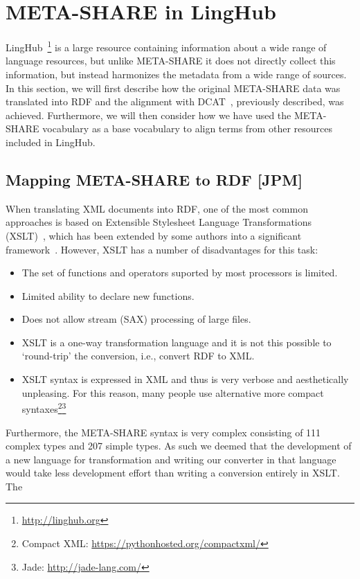\documentclass{llncs}
\begin{document}
{\section{META-SHARE in LingHub}
\label{sec:linghub}
LingHub~\footnote{\url{http://linghub.org}} is a large resource containing information about a wide range of
language resources, but unlike META-SHARE it does not directly collect this
information, but instead harmonizes the metadata from a wide range of sources.
In this section, we will first describe how the original META-SHARE data was
translated into RDF and the alignment with DCAT~\cite{maali2014data}, previously
described, was achieved. Furthermore, we will then consider how we have used the
META-SHARE vocabulary as a base vocabulary to align terms from other resources
included in LingHub.
\subsection{Mapping META-SHARE to RDF [JPM]}
\label{sec:conversion}
When translating XML documents into RDF, one of the most common approaches is
based on Extensible Stylesheet Language Transformations
(XSLT)~\cite{wustner2002converting,van2008xml,borin2014representing}, which has
been extended by some authors into a significant
framework~\cite{lange2009krextor}. However, XSLT has a number of disadvantages
for this task:
\begin{itemize}
\item The set of functions and operators suported by most processors is
limited.
\item Limited ability to declare new functions.
\item Does not allow stream (SAX) processing of large files.
\item XSLT is a one-way transformation language and it is not this possible
to `round-trip' the conversion, i.e., convert RDF to XML.
\item XSLT syntax is expressed in XML and thus is very verbose and
aesthetically unpleasing. For this reason, many people use alternative
more compact syntaxes\footnote{Compact XML:
\url{https://pythonhosted.org/compactxml/}}\footnote{Jade:
\url{http://jade-lang.com/}}
\end{itemize}
Furthermore, the META-SHARE syntax is very complex consisting of 111 complex
types and 207 simple types. As such we deemed that the development of a new
language for transformation and writing our converter in that language would
take less development effort than writing a conversion entirely in XSLT. The
}
\end{document}
